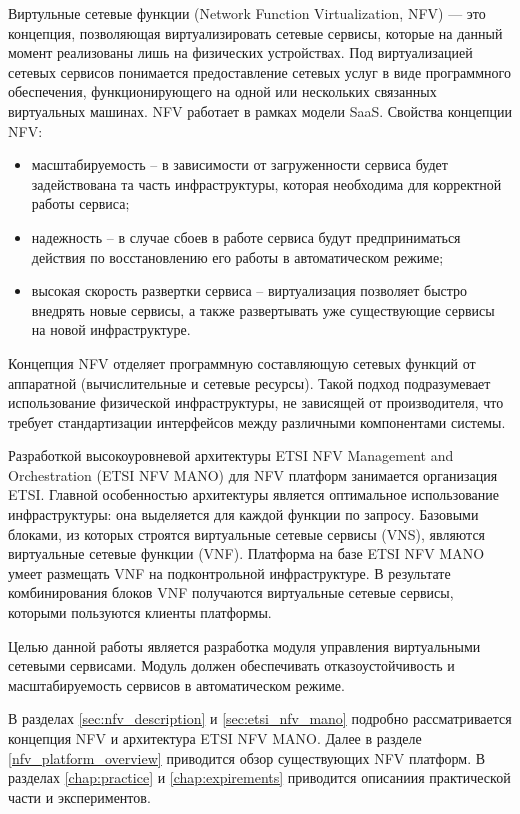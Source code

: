 \documentclass[oneside,final,14pt,a4paper]{extreport}
\begin{document}
Виртульные сетевые функции (Network Function Virtualization, NFV) --- это концепция, позволяющая виртуализировать сетевые сервисы, которые на данный момент реализованы лишь на физических устройствах. Под виртуализацией сетевых сервисов понимается предоставление сетевых услуг в виде программного обеспечения, функционирующего на одной или нескольких связанных виртуальных машинах. NFV работает в рамках модели SaaS. Свойства концепции NFV:
\begin{itemize}
	\item масштабируемость -- в зависимости от загруженности сервиса будет задействована та часть инфраструктуры, которая необходима для корректной работы сервиса;
	\item надежность -- в случае сбоев в работе сервиса будут предприниматься действия по восстановлению его работы в автоматическом режиме;
	\item высокая скорость развертки сервиса -- виртуализация позволяет быстро внедрять новые сервисы, а также развертывать уже существующие сервисы на новой инфраструктуре.
\end{itemize}

Концепция NFV отделяет программную составляющую сетевых функций от аппаратной (вычислительные и сетевые ресурсы). Такой подход подразумевает использование физической инфраструктуры, не зависящей от производителя, что требует стандартизации интерфейсов между различными компонентами системы.

Разработкой высокоуровневой архитектуры ETSI NFV Management and Orchestration (ETSI NFV MANO) для  NFV платформ занимается организация ETSI. Главной особенностью архитектуры является оптимальное использование инфраструктуры: она выделяется для каждой функции по запросу. Базовыми блоками, из которых строятся виртуальные сетевые сервисы (VNS), являются виртуальные сетевые функции (VNF). Платформа на базе ETSI NFV MANO умеет размещать VNF на подконтрольной инфраструктуре. В результате комбинирования блоков VNF получаются виртуальные сетевые сервисы, которыми пользуются клиенты платформы.

Целью данной работы является разработка модуля управления виртуальными сетевыми сервисами. Модуль должен обеспечивать отказоустойчивость и масштабируемость сервисов в автоматическом режиме.

В разделах \ref{sec:nfv_description} и \ref{sec:etsi_nfv_mano} подробно рассматривается концепция NFV и архитектура ETSI NFV MANO. Далее в разделе \ref{nfv_platform_overview} приводится обзор существующих NFV платформ. В разделах \ref{chap:practice} и \ref{chap:expirements} приводится описаниия практической части и экспериментов.
\end{document}
